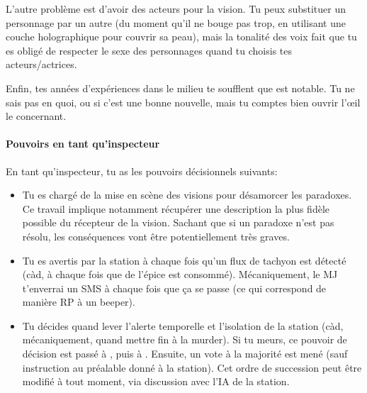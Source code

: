 {	\par L'autre problème est d'avoir des acteurs pour la vision. Tu peux substituer un personnage par un autre (du moment qu'il ne bouge pas trop, en utilisant une couche holographique pour couvrir sa peau), mais la tonalité des voix fait que tu es obligé de respecter le sexe des personnages quand tu choisis tes acteurs/actrices.
	
	\par Enfin, tes années d'expériences dans le milieu te soufflent que \nmPlayerXI est notable. Tu ne sais pas en quoi, ou si c'est une bonne nouvelle, mais tu comptes bien ouvrir l'œil le concernant.
	
	\paragraph{Pouvoirs en tant qu'inspecteur} En tant qu'inspecteur, tu as les pouvoirs décisionnels suivants:
	\begin{itemize}
		\item Tu es chargé de la mise en scène des visions pour désamorcer les paradoxes. Ce travail implique notamment récupérer une description la plus fidèle possible du récepteur de la vision. Sachant que si un paradoxe n'est pas résolu, les conséquences vont être potentiellement très graves.
		
		\item Tu es avertis par la station à chaque fois qu'un flux de tachyon est détecté (càd, à chaque fois que de l'épice est consommé). Mécaniquement, le MJ t'enverrai un SMS à chaque fois que ça se passe (ce qui correspond de manière RP à un beeper).
		
		\item Tu décides quand lever l'alerte temporelle et l'isolation de la station (càd, mécaniquement, quand mettre fin à la murder). Si tu meurs, ce pouvoir de décision est passé à \nmPlayerXII, puis à \nmPlayerVIII. Ensuite, un vote à la majorité est mené (sauf instruction au préalable donné à la station). Cet ordre de succession peut être modifié à tout moment, via discussion avec l'IA de la station.
	\end{itemize}
}




